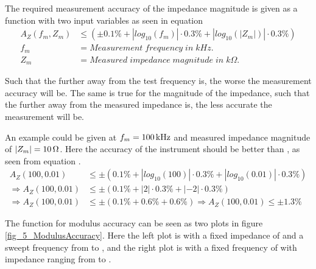 The required measurement accuracy of the impedance magnitude is given as a function with two input variables as seen in equation
\begin{equation}
  \begin{split}
      \label{eq:5:A_Z}
      A_Z(f_m, Z_m) & \leq \left(\pm 0.1\% + |log_{10}\left( f_m \right)|\cdot0.3\%+ |log_{10}\left( |Z_m| \right)|\cdot0.3\%\right)\\
      f_m & = Measurement \; frequency \; in \; kHz. \\
      Z_m &= Measured \; impedance \; magnitude \; in \; k\Omega.
  \end{split}
\end{equation}

Such that the further away from  the test frequency is, the worse the measurement accuracy will be. The same 
is true for the magnitude of the impedance, such that the further away from  the measured impedance is, the less
accurate the measurement will be.

An example could be given at $f_ m = \SI{100}{\kilo\hertz}$ and measured impedance magnitude of $|Z_m| = \SI{10}{\ohm}$. Here the
accuracy of the instrument should be better than , as seen from equation .
\begin{equation}
  \label{eq:5:A_Z_example}
  \begin{split}
    A_Z(100, 0.01) & \leq \pm \left(0.1\% + |log_{10}(100)|\cdot0.3\%+|log_{10}(0.01)|\cdot0.3\% \right)\\
    \Rightarrow A_Z(100, 0.01) & \leq \pm \left( 0.1\% + |2|\cdot0.3\%+|-2|\cdot0.3\% \right) \\
    \Rightarrow A_Z(100,0.01) & \leq \pm \left( 0.1\% + 0.6\% + 0.6\% \right) \Rightarrow A_Z(100,0.01) \leq \pm 1.3\% 
  \end{split}
\end{equation}

The function for modulus accuracy can be seen as two plots in figure \ref{fig_5_ModulusAccuracy}. Here the left plot is with a fixed impedance of 
and a sweept frequency from  to , and the right plot is with a fixed frequency of  with impedance ranging from  to .


